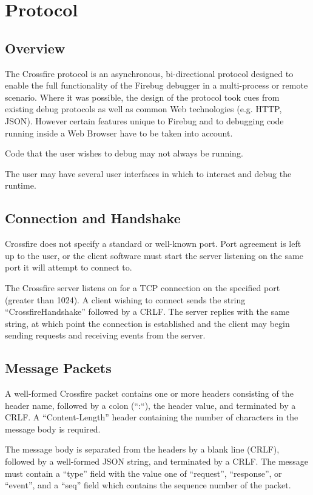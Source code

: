 \section {Protocol}
\subsection {Overview}
The Crossfire protocol is an asynchronous, bi-directional protocol designed to
enable the full functionality of the Firebug debugger in a multi-process or
remote scenario. Where it was possible, the design of the protocol took cues
from existing debug protocols as well as common Web technologies (e.g.
HTTP\cite{http}, JSON\cite{json}). However certain features unique to Firebug
and to debugging code running inside a Web Browser have to be taken into account.

Code that the user wishes to debug may not always be running.

The user may have several user interfaces in which to interact and debug the
runtime.

\subsection {Connection and Handshake}
Crossfire does not specify a standard or well-known port. Port agreement is left
up to the user, or the client software must start the server listening on
the same port it will attempt to connect to.

The Crossfire server listens on for a TCP connection on the specified port
(greater than 1024).  A client wishing to connect sends the string
``CrossfireHandshake'' followed by a CRLF. The server replies with the same
string, at which point the connection is established and the client may begin
sending requests and receiving events from the server.

\subsection {Message Packets}
A well-formed Crossfire packet contains one or more headers consisting of the
header name, followed by a colon (``:``), the header value, and terminated by a
CRLF. A ``Content-Length'' header containing the number of characters in the
message body is required.

The message body is separated from the headers by a blank line (CRLF), followed
by a well-formed JSON string, and terminated by a CRLF.  The message must
contain a ``type'' field with the value one of ``request'', ``response'', or
``event'', and a ``seq'' field which contains the sequence number of the packet.

